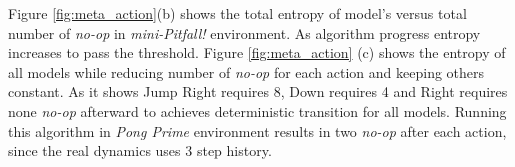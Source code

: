Figure \ref{fig:meta_action}(b) shows the total entropy of model's versus total number of \textit{no-op} in \textit{mini-Pitfall!} environment. As algorithm progress entropy increases to pass the threshold. Figure \ref{fig:meta_action} (c) shows the entropy of all models while reducing number of \textit{no-op} for each action and keeping others constant. As it shows Jump Right requires 8, Down requires 4 and Right requires none \textit{no-op} afterward to achieves deterministic transition for all models. Running this algorithm in \textit{Pong Prime} environment results in two \textit{no-op} after each action, since the real dynamics uses 3 step history.    
